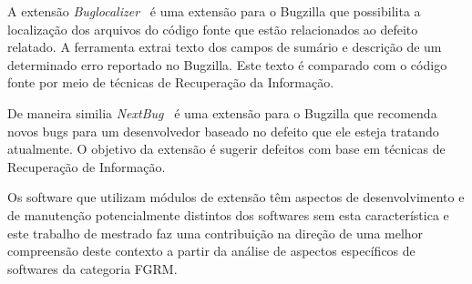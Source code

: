 A extensão \textit{Buglocalizer}~\cite{Thung:2014:BIT:2635868.2661678} é uma extensão para o Bugzilla que possibilita a localização dos arquivos do código fonte que estão relacionados ao defeito relatado. A ferramenta extrai texto dos campos de sumário e descrição de um determinado erro reportado no Bugzilla. Este texto é comparado com o código fonte por meio de técnicas de Recuperação da Informação.

De maneira similia \textit{NextBug}~\cite{101186} é uma extensão para o Bugzilla que
recomenda novos bugs para um desenvolvedor baseado no defeito que ele esteja
tratando atualmente. O objetivo da extensão é sugerir defeitos com base em técnicas de
Recuperação de Informação.

Os software que utilizam módulos de extensão têm aspectos de desenvolvimento e
de manutenção potencialmente distintos dos softwares sem esta característica e
este trabalho de mestrado faz uma contribuição na direção de uma melhor
compreensão deste contexto a partir da análise de aspectos específicos de
softwares da categoria FGRM.
